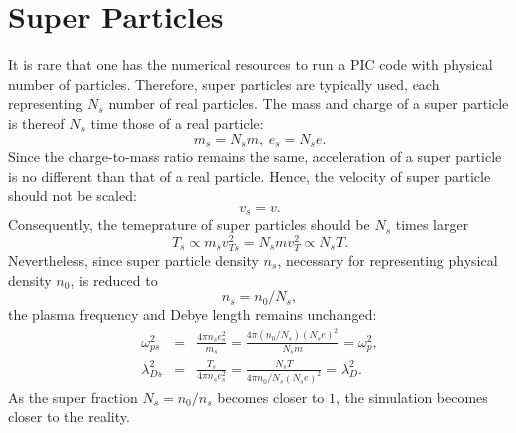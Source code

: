 \documentclass[paper=a4, fontsize=11pt]{scrartcl} %
\numberwithin{equation}{section} %
\numberwithin{figure}{section} %
\numberwithin{table}{section} %
\begin{document}
\section*{Super Particles}
It is rare that one has the numerical resources to run a PIC code with physical number of particles. Therefore, super particles are typically used, each representing $N_s$ number of real particles. The mass and charge of a super particle is thereof $N_s$ time those of a real particle:
\begin{equation}
    m_s=N_s m, \hspace{3pt} e_s=N_s e.
\end{equation}
Since the charge-to-mass ratio remains the same, acceleration of a super particle is no different than that of a real particle. Hence, the velocity of super particle should not be scaled:
\begin{equation}
    v_s=v.
\end{equation}
Consequently, the temeprature of super particles should be $N_s$ times larger
\begin{equation}
    T_s\propto m_s v_{Ts}^2=N_s m v_T^2\propto N_s T.
\end{equation}
Nevertheless, since super particle density $n_s$, necessary for representing physical density $n_0$, is reduced to
\begin{equation}
    n_s=n_0/N_s,
\end{equation}
the plasma frequency and Debye length remains unchanged:
\begin{eqnarray}
  \omega_{ps}^2&=&\frac{4\pi n_se_s^2}{m_s}=\frac{4\pi(n_0/N_s)(N_s e)^2}{N_s m}=\omega_p^2,\\
  \lambda_{Ds}^2&=&\frac{T_s}{4\pi n_s e_s^2}=\frac{N_s T}{4\pi n_0/N_s (N_s e)^2}=\lambda_D^2.
\end{eqnarray}
As the super fraction $N_s=n_0/n_s$ becomes closer to $1$, the simulation becomes closer to the reality.
\end{document}

